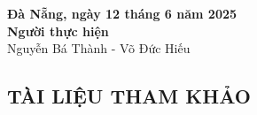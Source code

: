 \documentclass[a4paper,13pt]{article}
\begin{document}
\textbf{\hspace{7cm} Đà Nẵng, ngày 12 tháng 6 năm 2025}\\

\textbf{\hspace{9cm} Người thực hiện}\\

\hspace{7cm} Nguyễn Bá Thành - Võ Đức Hiếu \\


\clearpage
\begin{center}
    \section{TÀI LIỆU THAM KHẢO}
\end{center}
\vspace{-1.2cm}

\printbibliography[title={\empty}]
\end{document}

